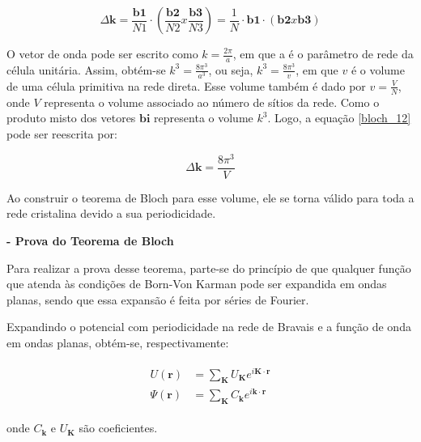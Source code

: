 		\begin{equation}
			\label{bloch_12}
			\Delta \mathbf{k} = \frac{\mathbf{b1}}{N1} \cdot \left( \frac{\mathbf{b2}}{N2} x \frac{\mathbf{b3}}{N3} \right)
				= \frac{1}{N} \cdot \mathbf{b1} \cdot \left(\mathbf{b2} x \mathbf{b3}\right)
		\end{equation}

		\par O vetor de onda pode ser escrito como $k=\frac{2\pi}{a}$, em que a é o parâmetro de rede da célula unitária. Assim, obtém-se $k^3=\frac{8\pi^3}{a^3}$, ou seja, $k^3=\frac{8\pi^3}{v}$, em que $v$ é o volume de uma célula primitiva na rede direta. Esse volume também é dado por $v=\frac{V}{N}$, onde $V$ representa o volume associado ao número de sítios da rede. Como o produto misto dos vetores $\mathbf{bi}$ representa o volume $k^3$. Logo, a equação \eqref{bloch_12} pode ser reescrita por:

		\begin{equation}
			\label{bloch_13}
			\Delta \mathbf{k} = \frac{8\pi^3}{V}
		\end{equation}

		\par Ao construir o teorema de Bloch para esse volume, ele se torna válido para toda a rede cristalina devido a sua periodicidade.

	\par \textbf{- Prova do Teorema de Bloch}

	\par Para realizar a prova desse teorema, parte-se do princípio de que qualquer função que atenda às condições de Born-Von Karman pode ser expandida em ondas planas, sendo que essa expansão é feita por séries de Fourier. 
	
	\par Expandindo o potencial com periodicidade na rede de Bravais e a função de onda em ondas planas, obtém-se, respectivamente: 

	\begin{align}\label{bloch_14}
	      \begin{array}{ll}
	        \displaystyle U(\mathbf{r}) &= \sum_{\mathbf{K}} U_{\mathbf{K}} e^{i\mathbf{K}\cdot \mathbf{r}}\\
	        \displaystyle \Psi(\mathbf{r}) &= \sum_{\mathbf{K}} C_{\mathbf{k}} e^{i\mathbf{k}\cdot \mathbf{r}}	            
	      \end{array}
  \end{align}

	onde $C_{\textbf{k}}$ e $U_{\textbf{K}}$ são coeficientes.

